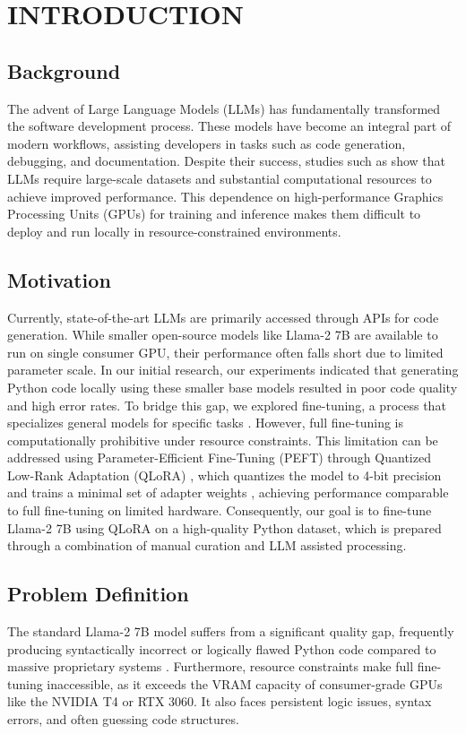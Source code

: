 \chapter{INTRODUCTION}
\section{Background}
The advent of Large Language Models (LLMs) has fundamentally transformed the software development process. These models have become an integral part of modern workflows, assisting developers in tasks such as code generation, debugging, and documentation. Despite their success, studies such as \cite{Kaplan2020Scaling} show that LLMs require large-scale datasets and substantial computational resources to achieve improved performance. This dependence on high-performance Graphics Processing Units (GPUs) for training and inference makes them difficult to deploy and run locally in resource-constrained environments.
\section{Motivation}
Currently, state-of-the-art LLMs are primarily accessed through APIs for code generation. While smaller open-source models like Llama-2 7B \cite{Touvron2023Llama2} are available to run on single consumer GPU, their performance often falls short due to limited parameter scale. In our initial research, our experiments indicated that generating Python code locally using these smaller base models resulted in poor code quality and high error rates. To bridge this gap, we explored fine-tuning, a process that specializes general models for specific tasks \cite{Howard2018ULMFiT}. However, full fine-tuning is computationally prohibitive under resource constraints. This limitation can be addressed using Parameter-Efficient Fine-Tuning (PEFT) through Quantized Low-Rank Adaptation (QLoRA) \cite{Dettmers2023}, which quantizes the model to 4-bit precision and trains a minimal set of adapter weights \cite{Hu2021}, achieving performance comparable to full fine-tuning on limited hardware. Consequently, our goal is to fine-tune Llama-2 7B using QLoRA on a high-quality Python dataset, which is prepared through a combination of manual curation and LLM assisted processing.

\section{Problem Definition}
The standard Llama-2 7B model suffers from a significant quality gap, frequently producing syntactically incorrect or logically flawed Python code compared to massive proprietary systems \cite{Diehl2024Llama2Benchmark}. Furthermore, resource constraints make full fine-tuning inaccessible, as it exceeds the VRAM capacity of consumer-grade GPUs like the NVIDIA T4 or RTX 3060. It also faces persistent logic issues, syntax errors, and often guessing code structures. 

